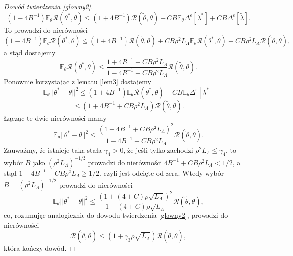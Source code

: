 \documentclass[man,mfiu]{mgrwms}
\begin{document}
\begin{proof}[Dowód twierdzenia \ref{glowny2}]
\begin{displaymath}
(1-4B^{-1})\mathbb{E}_{\theta}\mathcal{R}(\theta^*,\theta)\leq (1+4B^{-1})\mathcal{R}(\tilde{\theta},\theta)+CB\mathbb{E}_{\theta}\Delta^{\epsilon}[\lambda^*]+CB\Delta^{\epsilon}[\tilde{\lambda}].
\end{displaymath}
To prowadzi do nierówności
\begin{displaymath}
(1-4B^{-1})\mathbb{E}_{\theta}\mathcal{R}(\theta^*,\theta)\leq (1+4B^{-1})\mathcal{R}(\tilde{\theta},\theta)+CB\rho^2L_{\Lambda}\mathbb{E}_{\theta}\mathcal{R}(\theta^*,\theta)+CB\rho^2L_{\Lambda}\mathcal{R}(\tilde{\theta},\theta),
\end{displaymath}
a stąd dostajemy
\begin{displaymath}
\mathbb{E}_{\theta}\mathcal{R}(\theta^*,\theta)\leq\frac{1+4B^{-1}+CB\rho^2L_{\Lambda}}{1-4B^{-1}-CB\rho^2L_{\Lambda}}\mathcal{R}(\tilde{\theta},\theta).
\end{displaymath}
Ponownie korzystając z lematu \ref{lem3} dostajemy
\begin{displaymath}
\mathbb{E}_{\theta}||\theta^*-\theta||^2\leq (1+4B^{-1})\mathbb{E}_{\theta}\mathcal{R}(\theta^*,\theta)+CB\mathbb{E}_{\theta}\Delta^{\epsilon}[\lambda^*]
\end{displaymath}
\begin{displaymath}
\leq (1+4B^{-1}+CB\rho^2L_{\Lambda})\mathcal{R}(\tilde{\theta},\theta).
\end{displaymath}
Łącząc te dwie nierówności mamy
\begin{displaymath}
\mathbb{E}_{\theta}||\theta^*-\theta||^2\leq \frac{(1+4B^{-1}+CB\rho^2L_{\Lambda})^2}{1-4B^{-1}-CB\rho^2L_{\Lambda}}\mathcal{R}(\tilde{\theta},\theta).
\end{displaymath}
Zauważmy, że istnieje taka stała $\gamma_4>0$, że jeśli tylko zachodzi $\rho^2L_{\Lambda}\leq \gamma_4$, to wybór $B$ jako $(\rho^2L_{\Lambda})^{-1/2}$ prowadzi do nierówności $4B^{-1}+CB\rho^2L_{\Lambda}<1/2$, a stąd $1-4B^{-1}-CB\rho^2L_{\Lambda}\geq 1/2$. czyli jest odcięte od zera. Wtedy wybór $B=(\rho^2L_{\Lambda})^{-1/2}$ prowadzi do nierówności
\begin{displaymath}
\mathbb{E}_{\theta}||\theta^*-\theta||^2\leq \frac{(1+(4+C)\rho\sqrt{L_{\Lambda}})^2}{1-(4+C)\rho\sqrt{L_{\Lambda}}}\mathcal{R}(\tilde{\theta},\theta),
\end{displaymath}
co, rozumując analogicznie do dowodu twierdzenia \ref{glowny2}, prowadzi do nierówności
\begin{displaymath}
\mathcal{R}(\tilde{\theta},\theta)\leq (1+\gamma_3\rho\sqrt{L_{\Lambda}})\mathcal{R}(\tilde{\theta},\theta),
\end{displaymath}
która kończy dowód.
\end{proof}
\end{document}
